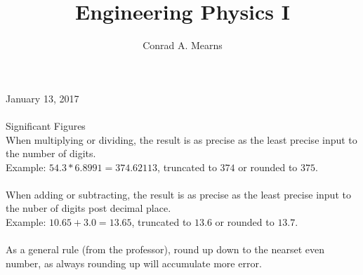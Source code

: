 \documentclass{article}
\title{Engineering Physics I}
\author{Conrad A. Mearns}
\begin{document}
\maketitle

\noindent
\Large
January 13, 2017\\\\
Significant Figures\\
\normalsize
\noindent
When multiplying or dividing, the result is as precise as the least precise input to the number of digits.\\
Example: $54.3 * 6.8991 = 374.62113$, truncated to $374$ or rounded to $375$.\\\\

\noindent
When adding or subtracting, the result is as precise as the least precise input to the nuber of digits post decimal place.\\
Example: $10.65 + 3.0 = 13.65$, truncated to $13.6$ or rounded to $13.7$.\\\\

\noindent
As a general rule (from the professor), round up down to the nearset even number, as always rounding up will accumulate more error.
\end{document}
